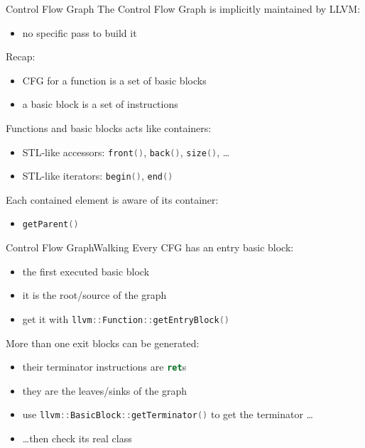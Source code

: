 \documentclass[10pt,mathserif]{beamer}
\newcommand{\cppinline}[1]{\lstinline[language=C++]!#1!}
\newcommand{\llvminline}[1]{\lstinline[language=LLVM]!#1!}
\begin{document}
\begin{frame}{Control Flow Graph}
The Control Flow Graph is implicitly maintained by LLVM:

\begin{itemize}
\item no specific pass to build it
\end{itemize}

Recap:

\begin{itemize}
\item CFG for a function is a set of basic blocks
\item a basic block is a set of instructions
\end{itemize}

Functions and basic blocks acts like containers:

\begin{itemize}
\item STL-like accessors: \cppinline{front()}, \cppinline{back()},
      \cppinline{size()}, \ldots
\item STL-like iterators: \cppinline{begin()}, \cppinline{end()}
\end{itemize}

Each contained element is aware of its container:

\begin{itemize}
\item \cppinline{getParent()}
\end{itemize}
\end{frame}

\begin{frame}{Control Flow Graph}{Walking}
Every CFG has an entry basic block:

\begin{itemize}
\item the \alert{first} executed basic block
\item it is the \alert{root/source} of the graph
\item get it with \cppinline{llvm::Function::getEntryBlock()}
\end{itemize}

More than one exit blocks can be generated:

\begin{itemize}
\item their terminator instructions are \llvminline{ret}s
\item they are the \alert{leaves/sinks} of the graph
\item use \cppinline{llvm::BasicBlock::getTerminator()} to get the terminator
      \ldots
\item \ldots then check its real class
\end{itemize}
\end{frame}
\end{document}
